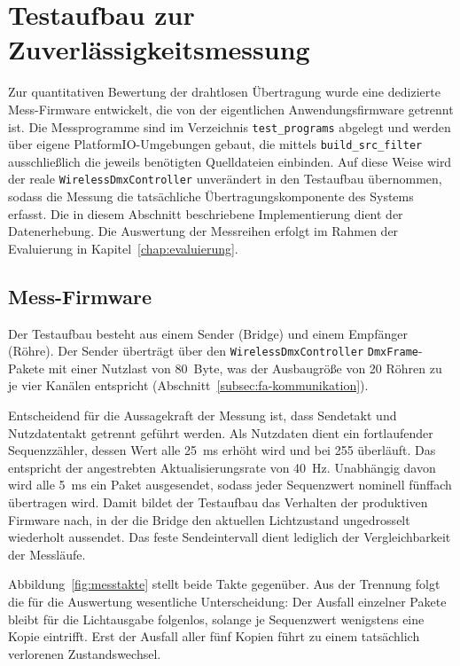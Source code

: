 \section{Testaufbau zur Zuverlässigkeitsmessung}
\label{sec:testaufbau}

Zur quantitativen Bewertung der drahtlosen Übertragung wurde eine
dedizierte Mess-Firmware entwickelt, die von der eigentlichen
Anwendungsfirmware getrennt ist. Die Messprogramme sind im Verzeichnis
\texttt{test\_programs} abgelegt und werden über eigene
PlatformIO-Umgebungen gebaut, die mittels \texttt{build\_src\_filter}
ausschließlich die jeweils benötigten Quelldateien einbinden. Auf diese
Weise wird der reale \texttt{WirelessDmxController} unverändert in den
Testaufbau übernommen, sodass die Messung die tatsächliche
Übertragungskomponente des Systems erfasst. Die in diesem Abschnitt
beschriebene Implementierung dient der Datenerhebung. Die Auswertung der
Messreihen erfolgt im Rahmen der Evaluierung in
Kapitel~\ref{chap:evaluierung}.

\subsection{Mess-Firmware}
\label{subsec:mess-firmware}

Der Testaufbau besteht aus einem Sender (Bridge) und einem Empfänger
(Röhre). Der Sender überträgt über den \texttt{WirelessDmxController}
\texttt{DmxFrame}-Pakete mit einer Nutzlast von 80~Byte, was der
Ausbaugröße von 20 Röhren zu je vier Kanälen entspricht
(Abschnitt~\ref{subsec:fa-kommunikation}).

Entscheidend für die Aussagekraft der Messung ist, dass Sendetakt und
Nutzdatentakt getrennt geführt werden. Als Nutzdaten dient ein
fortlaufender Sequenzzähler, dessen Wert alle 25~ms erhöht wird und bei
255 überläuft. Das entspricht der angestrebten Aktualisierungsrate von
40~Hz. Unabhängig davon wird alle 5~ms ein Paket ausgesendet, sodass
jeder Sequenzwert nominell fünffach übertragen wird. Damit bildet der
Testaufbau das Verhalten der produktiven Firmware nach, in der die Bridge
den aktuellen Lichtzustand ungedrosselt wiederholt aussendet. Das feste
Sendeintervall dient lediglich der Vergleichbarkeit der Messläufe.

Abbildung~\ref{fig:messtakte} stellt beide Takte gegenüber. Aus der
Trennung folgt die für die Auswertung wesentliche Unterscheidung: Der
Ausfall einzelner Pakete bleibt für die Lichtausgabe folgenlos, solange
je Sequenzwert wenigstens eine Kopie eintrifft. Erst der Ausfall aller
fünf Kopien führt zu einem tatsächlich verlorenen Zustandswechsel.


